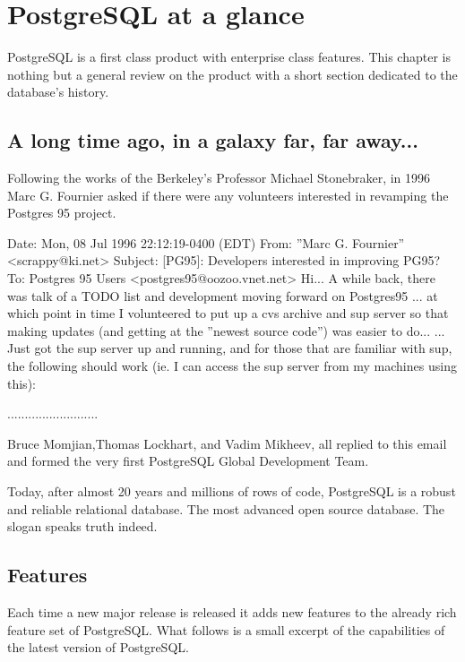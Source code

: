 \chapter{PostgreSQL at a glance}
PostgreSQL is a first class product with enterprise class features.
This chapter is nothing but a general review on the product with a short section dedicated to the
database's history.

\section{A long time ago, in a galaxy far, far away...}

Following the works of the Berkeley's Professor  Michael Stonebraker, in 1996
Marc G. Fournier asked if there were any volunteers interested
in revamping the Postgres 95 project.\newline
\begin{smallverbatim}

Date: Mon, 08 Jul 1996 22:12:19-0400 (EDT)
From: ”Marc G. Fournier” <scrappy@ki.net>
Subject: [PG95]: Developers interested in improving PG95?
To: Postgres 95 Users <postgres95@oozoo.vnet.net>
Hi... A while back, there was talk of a TODO list and development moving forward on Postgres95 ...
at which point in time I volunteered to put up a cvs archive and sup server so that making updates
(and getting at the ”newest source code”) was easier to do...
... Just got the sup server up and running, and for those that are familiar with sup, the following
should work (ie. I can access the sup server from my machines using this):

..........................
\end{smallverbatim}


Bruce Momjian,Thomas Lockhart,
and Vadim Mikheev, all replied to this email and formed the very first PostgreSQL Global Development Team.\newline

Today, after almost 20 years and millions of rows of code, PostgreSQL is a robust and reliable
relational database. The most advanced open source database. The slogan speaks truth indeed.

\section{Features}
Each time a new major release is released it adds new features to the already
rich feature set of PostgreSQL. What follows is a small excerpt of the capabilities of the latest version of PostgreSQL.

